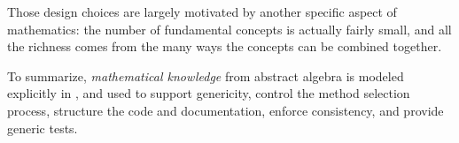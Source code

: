 
Those design choices are largely motivated by another specific aspect
of mathematics: the number of fundamental concepts is actually fairly
small, and all the richness comes from the many ways the concepts can
be combined together.

To summarize, \emph{mathematical knowledge} from abstract algebra is
modeled explicitly in \Sage, and used to support genericity, control
the method selection process, structure the code and documentation,
enforce consistency, and provide generic tests.



